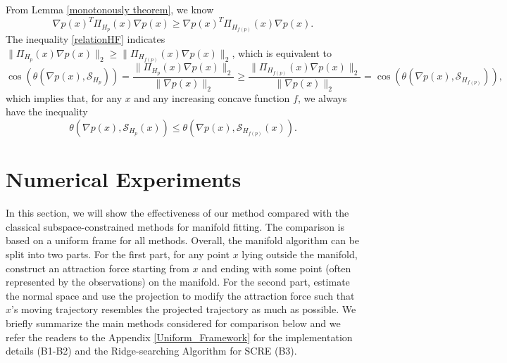 \documentclass[aos,preprint]{imsart}
\theoremstyle{remark}
\begin{document}
 From Lemma \ref{monotonously theorem}, we know
 \begin{equation}\label{relationHF}
 \nabla p(x)^T \Pi_{H_p}(x) \nabla p(x)\geq \nabla p(x)^T \Pi_{H_{f(p)}}(x) \nabla p(x).
 \end{equation}
 The inequality \eqref{relationHF} indicates $\| \Pi_{H_p}(x) \nabla p(x)\|_2 \geq  \|\Pi_{H_{f(p)}}(x) \nabla p(x)\|_2$, which is equivalent to 
 \begin{equation*}\label{angle_ineq}
\cos( \theta(\nabla p(x), {\mathcal S}_{H_p})) = \frac{\| \Pi_{H_p}(x) \nabla p(x)\|_2}{\|\nabla p(x)\|_2} 
\geq  \frac{\|\Pi_{H_{f(p)}}(x) \nabla p(x)\|_2}{\|\nabla p(x)\|_2} = \cos(\theta(\nabla p(x), {\mathcal S}_{H_{f(p)}})),
\end{equation*}
which implies that, for any $x$ and any increasing concave function $f$, we always have the inequality 
 \[
 \theta(\nabla p(x), {\mathcal S}_{H_{p}}(x)) \leq \theta(\nabla p(x), {\mathcal S}_{H_{f(p)}}(x)).\] 

\section{Numerical Experiments}\label{experiments}
In this section, we will show the effectiveness of our method compared with the classical subspace-constrained methods for manifold fitting. The comparison is based on a uniform frame for all methods.
Overall, the manifold algorithm can be split into two parts. For the first part, for any point ${x}$ lying outside the manifold, construct an attraction force starting from ${x}$ and ending with some point (often represented by the observations) on the manifold. For the second part, estimate the normal space and use the projection to modify the attraction force such that $x$'s moving trajectory resembles the projected trajectory as much as possible. We briefly summarize the main methods considered for comparison below and we refer the readers to the Appendix \ref{Uniform_Framework}  for the implementation details (B1-B2) and the Ridge-searching Algorithm for SCRE (B3).
\end{document}
